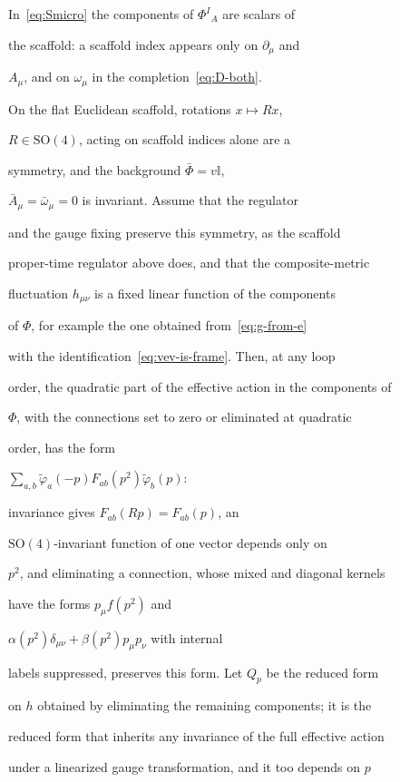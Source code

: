 In~\eqref{eq:Smicro} the components of \(\Phi^I{}_A\) are scalars of

the scaffold: a scaffold index appears only on \(\partial_\mu\) and

\(A_\mu\), and on \(\omega_\mu\) in the completion~\eqref{eq:D-both}.

On the flat Euclidean scaffold, rotations \(x\mapsto Rx\),

\(R\in\mathrm{SO}(4)\), acting on scaffold indices alone are a

symmetry, and the background \(\bar\Phi=v\mathbb I\),

\(\bar A_\mu=\bar\omega_\mu=0\) is invariant. Assume that the regulator

and the gauge fixing preserve this symmetry, as the scaffold

proper-time regulator above does, and that the composite-metric

fluctuation \(h_{\mu\nu}\) is a fixed linear function of the components

of \(\Phi\), for example the one obtained from~\eqref{eq:g-from-e}

with the identification~\eqref{eq:vev-is-frame}. Then, at any loop

order, the quadratic part of the effective action in the components of

\(\Phi\), with the connections set to zero or eliminated at quadratic

order, has the form

\(\sum_{a,b}\tilde\varphi_a(-p)F_{ab}(p^2)\tilde\varphi_b(p)\):

invariance gives \(F_{ab}(Rp)=F_{ab}(p)\), an

\(\mathrm{SO}(4)\)-invariant function of one vector depends only on

\(p^2\), and eliminating a connection, whose mixed and diagonal kernels

have the forms \(p_\mu f(p^2)\) and

\(\alpha(p^2)\delta_{\mu\nu}+\beta(p^2)p_\mu p_\nu\) with internal

labels suppressed, preserves this form. Let \(Q_p\) be the reduced form

on \(h\) obtained by eliminating the remaining components; it is the

reduced form that inherits any invariance of the full effective action

under a linearized gauge transformation, and it too depends on \(p\)

